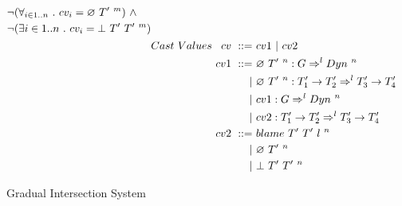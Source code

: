 \documentclass[a4paper]{article}
\begin{document}
\begin{figure}[H]
\begin{align*}
\begin{aligned}[t]
                                 &\neg(\forall_{i\in 1..n}\ .\ cv_i = \emptycast{T'}{m})\ \land\\
                                 &\neg(\exists{i\in 1..n}\ .\ cv_i = \stuckcast{T'}{T'}{m}) \end{aligned}\\
&Cast\ Values\ \begin{aligned}[t] cv\ ::=&\ cv1\ |\ cv2\\
                                cv1\ ::=&\ \emptycast{T'}{n} : G \Rightarrow^l \Dyn\ ^n\\
                                       |&\ \emptycast{T'}{n} : T'_1 \rightarrow T'_2 \Rightarrow^l T'_3 \rightarrow T'_4\\
                                       |&\ cv1 : G \Rightarrow^l \Dyn\ ^n\\
                                       |&\ cv2 : T'_1 \rightarrow T'_2 \Rightarrow^l T'_3 \rightarrow T'_4\\
                                cv2\ ::=&\ \blamecast{T'}{T'}{l}{n}\\
                                       |&\ \emptycast{T'}{n}\\
                                       |&\ \stuckcast{T'}{T'}{n} \end{aligned}
\end{align*}

\hrulefill
\caption{Gradual Intersection System}
\label{intersection_syntax}
\end{figure}
\end{document}
